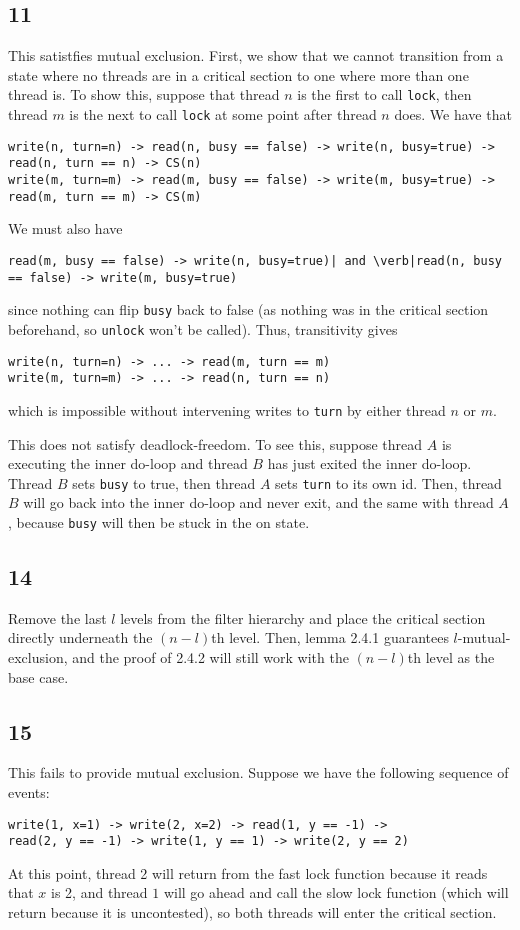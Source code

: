 \documentclass{article}
\begin{document}
\subsection*{11}
This satistfies mutual exclusion. First, we show that we cannot transition from a state where no threads are in a critical section to one where more than one thread is. To show this, suppose that thread $n$ is the first to call \verb|lock|, then thread $m$ is the next to call \verb|lock| at some point after thread $n$ does. We have that 
\begin{verbatim}
write(n, turn=n) -> read(n, busy == false) -> write(n, busy=true) -> read(n, turn == n) -> CS(n)
write(m, turn=m) -> read(m, busy == false) -> write(m, busy=true) -> read(m, turn == m) -> CS(m)
\end{verbatim}
We must also have 
\begin{verbatim}
read(m, busy == false) -> write(n, busy=true)| and \verb|read(n, busy == false) -> write(m, busy=true)
\end{verbatim}
since nothing can flip \verb|busy| back to false (as nothing was in the critical section beforehand, so \verb|unlock| won't be called). Thus, transitivity gives
\begin{verbatim}
write(n, turn=n) -> ... -> read(m, turn == m)
write(m, turn=m) -> ... -> read(n, turn == n)
\end{verbatim}
which is impossible without intervening writes to \verb|turn| by either thread $n$ or $m$.

This does not satisfy deadlock-freedom. To see this, suppose thread $A$ is executing the inner do-loop and thread $B$ has just exited the inner do-loop. Thread $B$ sets \verb|busy| to true, then thread $A$ sets \verb|turn| to its own id. Then, thread $B$ will go back into the inner do-loop and never exit, and the same with thread $A$, because \verb|busy| will then be stuck in the on state. 
\subsection*{14}
Remove the last $l$ levels from the filter hierarchy and place the critical section directly underneath the $(n-l)$th level. Then, lemma 2.4.1 guarantees $l$-mutual-exclusion, and the proof of 2.4.2 will still work with the $(n-l)$th level as the base case.
\subsection*{15}
This fails to provide mutual exclusion. Suppose we have the following sequence of events:
\begin{verbatim}
write(1, x=1) -> write(2, x=2) -> read(1, y == -1) -> 
read(2, y == -1) -> write(1, y == 1) -> write(2, y == 2)
\end{verbatim}
At this point, thread 2 will return from the fast lock function because it reads that $x$ is 2, and thread $1$ will go ahead and call the slow lock function (which will return because it is uncontested), so both threads will enter the critical section.
\end{document}
